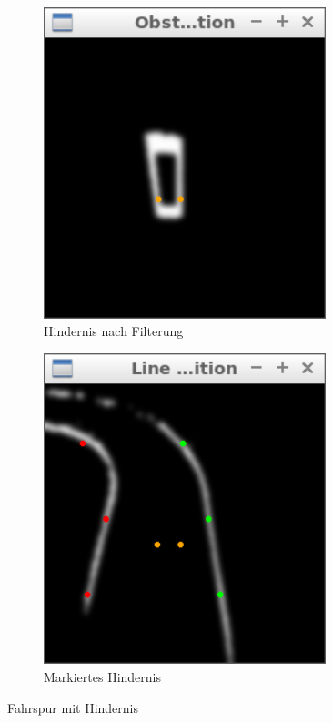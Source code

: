 \begin{figure}
\begin{subfigure}{0.45\textwidth}
		\includegraphics[width=0.9\textwidth]{images/obstacle_alone_bw.png}
		\caption{Hindernis nach Filterung}
	\end{subfigure}
	\begin{subfigure}{0.45\textwidth}
		\centering
		\includegraphics[width=0.9\textwidth]{images/obstacle_bw.png}
		\caption{Markiertes Hindernis}
	\end{subfigure}
	\caption{Fahrspur mit Hindernis}
	\label{Bild von Hindernis}
\end{figure}


